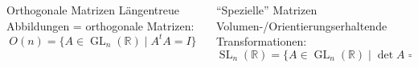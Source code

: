 \begin{frame}[t]
\begin{columns}[t,onlytextwidth]
\end{columns}
%
\vspace{-3pt}
\begin{columns}[t,onlytextwidth]
\begin{column}{0.48\textwidth}
\begin{block}{Orthogonale Matrizen}
Längentreue Abbildungen = orthogonale Matrizen:
\[
O(n)
=
\{
A \in \operatorname{GL}_n(\mathbb{R})
\;|\;
A^tA=I
\}
\]
\end{block}
\end{column}
\begin{column}{0.48\textwidth}
\begin{block}{``Spezielle'' Matrizen}
Volumen-/Orientierungserhaltende Transformationen:
\[
\operatorname{SL}_n(\mathbb R) 
=
\{ A \in \operatorname{GL}_n(\mathbb{R}) \;|\; \det A = 1\}
\]
\end{block}
\end{column}
\end{columns}

\end{frame}
\egroup
